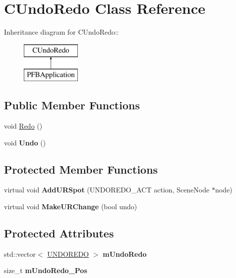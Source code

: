 \hypertarget{class_c_undo_redo}{
\section{CUndoRedo Class Reference}
\label{class_c_undo_redo}
}
Inheritance diagram for CUndoRedo::\begin{figure}[H]
\begin{center}
\leavevmode
\includegraphics[height=2cm]{class_c_undo_redo}
\end{center}
\end{figure}
\subsection*{Public Member Functions}
\begin{DoxyCompactItemize}
\item 
void \hyperlink{class_c_undo_redo_a006d3ce73fa8eb51e69b492fdc60ead7}{Redo} ()
\item 
\hypertarget{class_c_undo_redo_ad8fe35044a70bf2a9464b46d3fb750ad}{
void {\bfseries Undo} ()}
\label{class_c_undo_redo_ad8fe35044a70bf2a9464b46d3fb750ad}

\end{DoxyCompactItemize}
\subsection*{Protected Member Functions}
\begin{DoxyCompactItemize}
\item 
\hypertarget{class_c_undo_redo_a43a2be402ab6a144f5901d7e5316d7db}{
virtual void {\bfseries AddURSpot} (UNDOREDO\_\-ACT action, SceneNode $\ast$node)}
\label{class_c_undo_redo_a43a2be402ab6a144f5901d7e5316d7db}

\item 
\hypertarget{class_c_undo_redo_a728974f43d8459a86ba4d8b916efbff4}{
virtual void {\bfseries MakeURChange} (bool undo)}
\label{class_c_undo_redo_a728974f43d8459a86ba4d8b916efbff4}

\end{DoxyCompactItemize}
\subsection*{Protected Attributes}
\begin{DoxyCompactItemize}
\item 
\hypertarget{class_c_undo_redo_a97f66a37bbcd82da9d9c1f12ae4822f4}{
std::vector$<$ \hyperlink{struct_u_n_d_o_r_e_d_o}{UNDOREDO} $>$ {\bfseries mUndoRedo}}
\label{class_c_undo_redo_a97f66a37bbcd82da9d9c1f12ae4822f4}

\item 
\hypertarget{class_c_undo_redo_a711a2c556edce4acfa3694e013fe7ac2}{
size\_\-t {\bfseries mUndoRedo\_\-Pos}}
\label{class_c_undo_redo_a711a2c556edce4acfa3694e013fe7ac2}

\end{DoxyCompactItemize}


